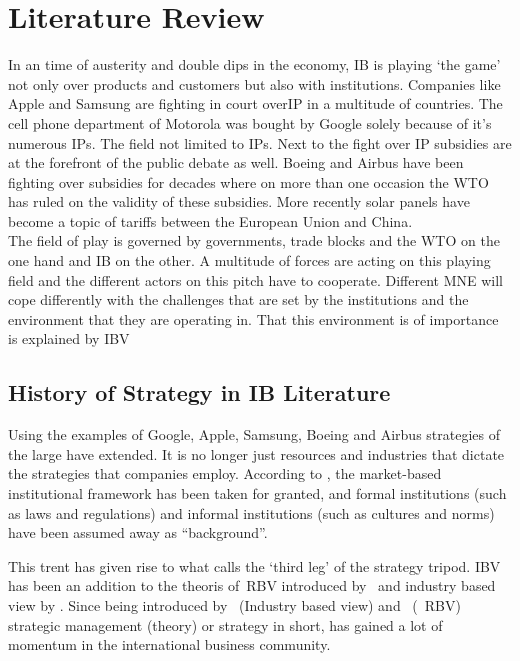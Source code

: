 \chapter{Literature Review}



In an time of austerity and double dips in the economy, \gls{IB} is playing `the game' not only over products and customers but also with institutions. Companies like Apple and Samsung are  fighting in court over\gls{IP} in a multitude of countries. The cell phone department of Motorola was bought by Google solely because of it's numerous \glspl{IP}. The field not limited to \glspl{IP}. Next to the fight over \gls{IP} subsidies are at the forefront of the public debate as well. Boeing and Airbus have been fighting over subsidies for decades where on more than one occasion the \gls{WTO} has ruled on the validity of these subsidies. More recently solar panels have become a topic of tariffs between the European Union and China. \\

The field of play is governed by governments, trade blocks and the \gls{WTO} on the one hand and \gls{IB} on the other.
A multitude of forces are acting on this playing field and the different actors on this pitch have to cooperate. 
Different \gls{MNE} will cope differently with the challenges that are set by the institutions and the environment that they are operating in. That this environment is of importance is explained by \gls{IBV}~\cite{Kostova:1999,Meyer:2009,Wang:2012} 

\section{History of Strategy in IB Literature}

Using the examples of Google, Apple, Samsung, Boeing and Airbus strategies of the large \mne have extended. It is no longer just resources and industries that dictate the strategies that companies employ. According to \cite{Peng:2009}, the market-based institutional framework has been taken for granted, and formal institutions (such as laws and regulations) and informal institutions (such as cultures and norms) have been assumed away as ``background''.

This trent has given rise to what \cite{Peng:2009} calls the `third leg' of the strategy tripod. \Gls{IBV} has been an addition to the theoris of~\gls{RBV} introduced by~\cite{Barney:1991} and industry based view by \cite{Porter:1980}. 
Since being introduced by~\cite{Porter:1980} (Industry based view) and~\cite{Barney:1991} (~\gls{RBV}) strategic management (theory) or strategy in short, has gained a lot of momentum in the international business community. 
\\ 

